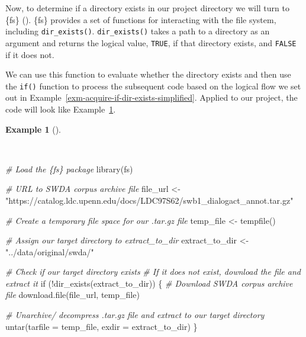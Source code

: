 \documentclass[
  letterpaper,
]{latex/krantz}
\newenvironment{Shaded}{\begin{snugshade}}{\end{snugshade}}
\newcommand{\AttributeTok}[1]{\textcolor[rgb]{0.00,0.00,0.00}{#1}}
\newcommand{\CommentTok}[1]{\textcolor[rgb]{0.00,0.00,0.00}{\textit{#1}}}
\newcommand{\ControlFlowTok}[1]{\textcolor[rgb]{0.00,0.00,0.00}{#1}}
\newcommand{\FunctionTok}[1]{\textcolor[rgb]{0.00,0.00,0.00}{#1}}
\newcommand{\NormalTok}[1]{\textcolor[rgb]{0.00,0.00,0.00}{#1}}
\newcommand{\OtherTok}[1]{\textcolor[rgb]{0.00,0.00,0.00}{#1}}
\newcommand{\SpecialCharTok}[1]{\textcolor[rgb]{0.00,0.00,0.00}{#1}}
\newcommand{\StringTok}[1]{\textcolor[rgb]{0.00,0.00,0.00}{#1}}
\theoremstyle{definition}
\newtheorem{example}{Example}[chapter]
\theoremstyle{remark}
\begin{document}
Now, to determine if a directory exists in our project directory we will
turn to \{fs\} ().
\{fs\} provides a set of functions for interacting with the file system,
including \texttt{dir\_exists()}. \texttt{dir\_exists()} takes a path to
a directory as an argument and returns the logical value, \texttt{TRUE},
if that directory exists, and \texttt{FALSE} if it does not.

We can use this function to evaluate whether the directory exists and
then use the \texttt{if()} function to process the subsequent code based
on the logical flow we set out in
Example~\ref{exm-acquire-if-dir-exists-simplified}. Applied to our
project, the code will look like
Example~\ref{exm-acquire-swda-if-dir-exists}.

\begin{example}[]\protect\hypertarget{exm-acquire-swda-if-dir-exists}{}\label{exm-acquire-swda-if-dir-exists}

~

\begin{Shaded}
\begin{Highlighting}[]
\CommentTok{\# Load the \{fs\} package}
\FunctionTok{library}\NormalTok{(fs)}

\CommentTok{\# URL to SWDA corpus archive file}
\NormalTok{file\_url }\OtherTok{\textless{}{-}}
  \StringTok{"https://catalog.ldc.upenn.edu/docs/LDC97S62/swb1\_dialogact\_annot.tar.gz"}

\CommentTok{\# Create a temporary file space for our .tar.gz file}
\NormalTok{temp\_file }\OtherTok{\textless{}{-}} \FunctionTok{tempfile}\NormalTok{()}

\CommentTok{\# Assign our target directory to \textasciigrave{}extract\_to\_dir\textasciigrave{}}
\NormalTok{extract\_to\_dir }\OtherTok{\textless{}{-}} \StringTok{"../data/original/swda/"}

\CommentTok{\# Check if our target directory exists}
\CommentTok{\# If it does not exist, download the file and extract it}
\ControlFlowTok{if}\NormalTok{ (}\SpecialCharTok{!}\FunctionTok{dir\_exists}\NormalTok{(extract\_to\_dir)) \{}
  \CommentTok{\# Download SWDA corpus archive file}
  \FunctionTok{download.file}\NormalTok{(file\_url, temp\_file)}

  \CommentTok{\# Unarchive/ decompress .tar.gz file and extract to our target directory}
  \FunctionTok{untar}\NormalTok{(}\AttributeTok{tarfile =}\NormalTok{ temp\_file, }\AttributeTok{exdir =}\NormalTok{ extract\_to\_dir)}
\NormalTok{\}}
\end{Highlighting}
\end{Shaded}

\end{example}
\end{document}
